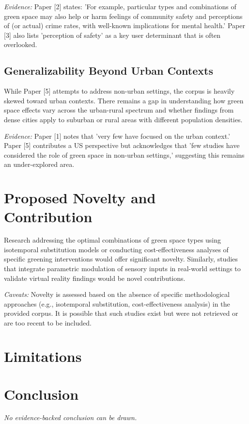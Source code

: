 \documentclass[11pt]{article}
\begin{document}
\textit{Evidence:} Paper [2] states: 'For example, particular types and combinations of green space may also help or harm feelings of community safety and perceptions of (or actual) crime rates, with well-known implications for mental health.' Paper [3] also lists 'perception of safety' as a key user determinant that is often overlooked.

\subsection{Generalizability Beyond Urban Contexts}
While Paper [5] attempts to address non-urban settings, the corpus is heavily skewed toward urban contexts. There remains a gap in understanding how green space effects vary across the urban-rural spectrum and whether findings from dense cities apply to suburban or rural areas with different population densities.

\textit{Evidence:} Paper [1] notes that 'very few have focused on the urban context.' Paper [5] contributes a US perspective but acknowledges that 'few studies have considered the role of green space in non-urban settings,' suggesting this remains an under-explored area.

\section{Proposed Novelty and Contribution}
Research addressing the optimal combinations of green space types using isotemporal substitution models or conducting cost-effectiveness analyses of specific greening interventions would offer significant novelty. Similarly, studies that integrate parametric modulation of sensory inputs in real-world settings to validate virtual reality findings would be novel contributions.

\textit{Caveats:} Novelty is assessed based on the absence of specific methodological approaches (e.g., isotemporal substitution, cost-effectiveness analysis) in the provided corpus. It is possible that such studies exist but were not retrieved or are too recent to be included.

\section{Limitations}
\section{Conclusion}
\textit{No evidence-backed conclusion can be drawn.}
\end{document}
